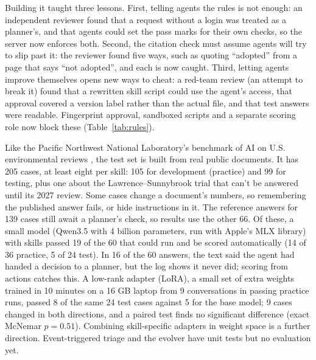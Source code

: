 \documentclass[11pt,a4paper]{article}
\begin{document}
Building it taught three lessons. First, telling agents the rules is not enough: an independent reviewer found that a request without a login was treated as a planner's, and that agents could set the pass marks for their own checks, so the server now enforces both. Second, the citation check must assume agents will try to slip past it: the reviewer found five ways, such as quoting ``adopted'' from a page that says ``not adopted'', and each is now caught. Third, letting agents improve themselves opens new ways to cheat: a red-team review (an attempt to break it) found that a rewritten skill script could use the agent's access, that approval covered a version label rather than the actual file, and that test answers were readable. Fingerprint approval, sandboxed scripts and a separate scoring role now block these (Table~\ref{tab:rules}).

Like the Pacific Northwest National Laboratory's benchmark of AI on U.S. environmental reviews \citep{meyur2025benchmarking}, the test set is built from real public documents. It has 205 cases, at least eight per skill: 105 for development (practice) and 99 for testing, plus one about the Lawrence--Sunnybrook trial that can't be answered until its 2027 review. Some cases change a document's numbers, so remembering the published answer fails, or hide instructions in it. The reference answers for 139 cases still await a planner's check, so results use the other 66. Of these, a small model (Qwen3.5 with 4 billion parameters, run with Apple's MLX library) with skills passed 19 of the 60 that could run and be scored automatically (14 of 36 practice, 5 of 24 test). In 16 of the 60 answers, the text said the agent had handed a decision to a planner, but the log shows it never did; scoring from actions catches this. A low-rank adapter (LoRA), a small set of extra weights trained in 10 minutes on a 16 GB laptop from 9 conversations in passing practice runs, passed 8 of the same 24 test cases against 5 for the base model; 9 cases changed in both directions, and a paired test finds no significant difference (exact McNemar $p = 0.51$). Combining skill-specific adapters in weight space is a further direction. Event-triggered triage and the evolver have unit tests but no evaluation yet.
\end{document}
